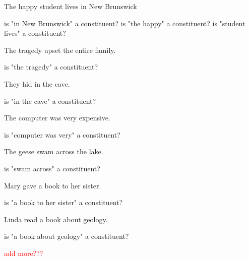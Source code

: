 \documentclass[a4paper,11pt]{article}
\begin{document}
\begin{exe}
\ex The happy student lives in New Brunswick \begin{xlist}
	\ex is "in New Brunswick" a constituent?
	\ex is "the happy" a constituent? 
	\ex is "student lives" a constituent?
\end{xlist}
\vspace{1cm}
\ex The tragedy upset the entire family. \begin{xlist}
	\ex is "the tragedy" a constituent?
\end{xlist}
\vspace{1cm}
\ex They hid in the cave. \begin{xlist}
	\ex is "in the cave" a constituent? 
\end{xlist}
\vspace{1cm}
\ex The computer was very expensive. \begin{xlist}
	\ex is "computer was very" a constituent?
\end{xlist}
\vspace{1cm}
\ex The geese swam across the lake. \begin{xlist}
	\ex is "swam across" a constituent? 
\end{xlist}
\vspace{1cm}
\ex Mary gave a book to her sister. \begin{xlist}
	\ex is "a book to her sister" a constituent?
\end{xlist}
\vspace{1cm}
\ex Linda read a book about geology. \begin{xlist}
	\ex is "a book about geology" a constituent?
\end{xlist}
\vspace{1cm}
\ex \textcolor{red}{add more???}
\end{exe}
\end{document}
